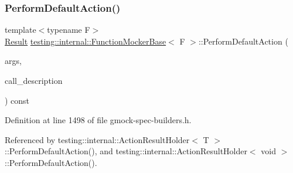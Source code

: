 \subsubsection{\texorpdfstring{Perform\+Default\+Action()}{PerformDefaultAction()}}
{\footnotesize\ttfamily template$<$typename F$>$ \\
\hyperlink{classtesting_1_1internal_1_1FunctionMockerBase_aa50abc4055b4d3a14ad64c317bccec8d}{Result} \hyperlink{classtesting_1_1internal_1_1FunctionMockerBase}{testing\+::internal\+::\+Function\+Mocker\+Base}$<$ F $>$\+::Perform\+Default\+Action (\begin{DoxyParamCaption}\item[{const \hyperlink{classtesting_1_1internal_1_1FunctionMockerBase_a336432a07e544af4ffb8103603471ca3}{Argument\+Tuple} \&}]{args,  }\item[{const \hyperlink{namespacetesting_1_1internal_a8e8ff5b11e64078831112677156cb111}{string} \&}]{call\+\_\+description }\end{DoxyParamCaption}) const\hspace{0.3cm}{\ttfamily [inline]}}



Definition at line 1498 of file gmock-\/spec-\/builders.\+h.



Referenced by testing\+::internal\+::\+Action\+Result\+Holder$<$ T $>$\+::\+Perform\+Default\+Action(), and testing\+::internal\+::\+Action\+Result\+Holder$<$ void $>$\+::\+Perform\+Default\+Action().



